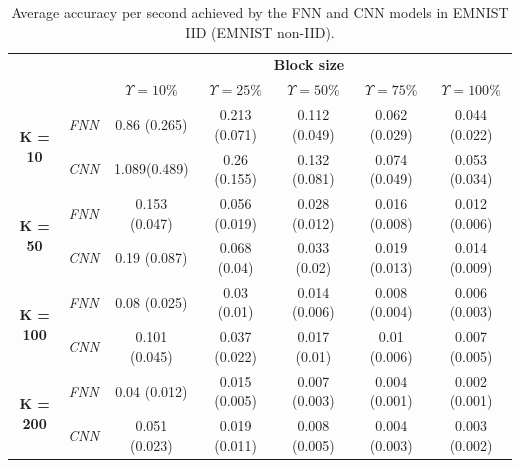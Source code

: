 \documentclass[lettersize,journal]{IEEEtran}
\begin{document}
\begin{table}[ht!]
\centering
\caption{Average accuracy per second achieved by the FNN and CNN models in EMNIST IID (EMNIST non-IID).}
\label{tab:acuracy_per_second}
\begin{tabular}{|cc|ccccc|}
\hline
\multicolumn{2}{|c|}{\multirow{2}{*}{}} & \multicolumn{5}{c|}{\textbf{Block size}} \\ \cline{3-7} 
\multicolumn{2}{|c|}{} & \multicolumn{1}{c|}{\textbf{$\Upsilon=10\%$}} & \multicolumn{1}{c|}{\textbf{$\Upsilon=25\%$}} & \multicolumn{1}{c|}{\textbf{$\Upsilon=50\%$}} & \multicolumn{1}{c|}{\textbf{$\Upsilon=75\%$}} & \textbf{$\Upsilon=100\%$} \\ \hline
\multicolumn{1}{|c|}{\multirow{2}{*}{\textbf{K = 10}}} & \textit{FNN} & \multicolumn{1}{c|}{0.86 (0.265)} & \multicolumn{1}{c|}{0.213 (0.071)} & \multicolumn{1}{c|}{0.112 (0.049)} & \multicolumn{1}{c|}{0.062 (0.029)} & 0.044 (0.022) \\ \cline{2-7} 
\multicolumn{1}{|c|}{} & \textit{CNN} & \multicolumn{1}{c|}{1.089(0.489)} & \multicolumn{1}{c|}{0.26 (0.155)} & \multicolumn{1}{c|}{0.132 (0.081)} & \multicolumn{1}{c|}{0.074 (0.049)} & 0.053 (0.034) \\ \hline
\multicolumn{1}{|c|}{\multirow{2}{*}{\textbf{K = 50}}} & \textit{FNN} & \multicolumn{1}{c|}{0.153 (0.047)} & \multicolumn{1}{c|}{0.056 (0.019)} & \multicolumn{1}{c|}{0.028 (0.012)} & \multicolumn{1}{c|}{0.016 (0.008)} & 0.012 (0.006) \\ \cline{2-7} 
\multicolumn{1}{|c|}{} & \textit{CNN} & \multicolumn{1}{c|}{0.19 (0.087)} & \multicolumn{1}{c|}{0.068 (0.04)} & \multicolumn{1}{c|}{0.033 (0.02)} & \multicolumn{1}{c|}{0.019 (0.013)} & 0.014 (0.009) \\ \hline
\multicolumn{1}{|c|}{\multirow{2}{*}{\textbf{K = 100}}} & \textit{FNN} & \multicolumn{1}{c|}{0.08 (0.025)} & \multicolumn{1}{c|}{0.03 (0.01)} & \multicolumn{1}{c|}{0.014 (0.006)} & \multicolumn{1}{c|}{0.008 (0.004)} & 0.006 (0.003) \\ \cline{2-7} 
\multicolumn{1}{|c|}{} & \textit{CNN} & \multicolumn{1}{c|}{0.101 (0.045)} & \multicolumn{1}{c|}{0.037 (0.022)} & \multicolumn{1}{c|}{0.017 (0.01)} & \multicolumn{1}{c|}{0.01 (0.006)} & 0.007 (0.005) \\ \hline
\multicolumn{1}{|c|}{\multirow{2}{*}{\textbf{K = 200}}} & \textit{FNN} & \multicolumn{1}{c|}{0.04 (0.012)} & \multicolumn{1}{c|}{0.015 (0.005)} & \multicolumn{1}{c|}{0.007 (0.003)} & \multicolumn{1}{c|}{0.004 (0.001)} & 0.002 (0.001) \\ \cline{2-7} 
\multicolumn{1}{|c|}{} & \textit{CNN} & \multicolumn{1}{c|}{0.051 (0.023)} & \multicolumn{1}{c|}{0.019 (0.011)} & \multicolumn{1}{c|}{0.008 (0.005)} & \multicolumn{1}{c|}{0.004 (0.003)} & 0.003 (0.002) \\ \hline
\end{tabular}
\end{table}
\end{document}
